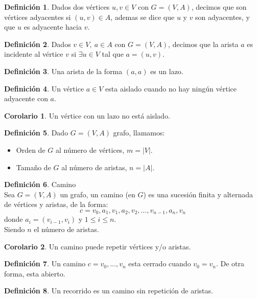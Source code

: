 \documentclass[10pt]{article}
\theoremstyle{definition}
\newtheorem{definition}{Definición}[section]
\newtheorem{corollary}{Corolario}[theorem]
\begin{document}
    \begin{definition}
        Dados dos vértices $u,v\in V$ con $G=(V,A)$, decimos que son vértices adyacentes si $(u,v)\in A$, ademas se dice que $u$ y $v$ son adyacentes, y que $u$ es adyacente hacia $v$.
    \end{definition}
    \begin{definition}
        Dados $v\in V,\ a\in A$ con $G=(V,A)$, decimos que la arista $a$ es incidente al vértice $v$ si $\exists u\in V$ tal que $a=(u,v)$.
    \end{definition}
    \begin{definition}
        Una arista de la forma $(a,a)$ es un lazo.
    \end{definition}
    \begin{definition}
        Un vértice $a\in V$ esta aislado cuando no hay ningún vértice adyacente con $a$.
    \end{definition}
    \begin{corollary}
        Un vértice con un lazo no está aislado.
    \end{corollary}
    \begin{definition}
        Dado $G=(V,A)$ grafo, llamamos:
        \begin{itemize}
            \item Orden de $G$ al número de vértices, $m=|V|$.
            \item Tamaño de $G$ al número de aristas, $n=|A|$.
        \end{itemize}
    \end{definition}
    \begin{definition}{Camino}
        \\Sea $G=(V,A)$ un grafo, un camino (en $G$) es una sucesión finita y alternada de vértices y aristas, de la forma: $$c=v_0,a_1,v_1,a_2,v_2,\dots,v_{n-1},a_n,v_n$$donde $a_i=(v_{i-1},v_i)$ y $1\le i\le n$.\\Siendo $n$ el número de aristas.
    \end{definition}
    \begin{corollary}
        Un camino puede repetir vértices y/o aristas.
    \end{corollary}
    \begin{definition}
        Un camino $c=v_0,\dots,v_n$ esta cerrado cuando $v_0=v_n$. De otra forma, esta abierto.
    \end{definition}
    \begin{definition}
        Un recorrido es un camino sin repetición de aristas.
    \end{definition}
\end{document}
